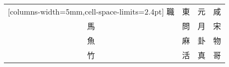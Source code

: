 \documentclass{standalone}
\begin{document}
\begin{NiceTabular}{*{4}{c}}[columns-width=5mm,cell-space-limits=2.4pt]
	職 & 東 & 元 & 咸 \\
	馬 & 問 & 月 & 宋 \\
	魚 & 麻 & 卦 & 物 \\
	竹 & 活 & 真 & 哥
\end{NiceTabular}
\end{document}
